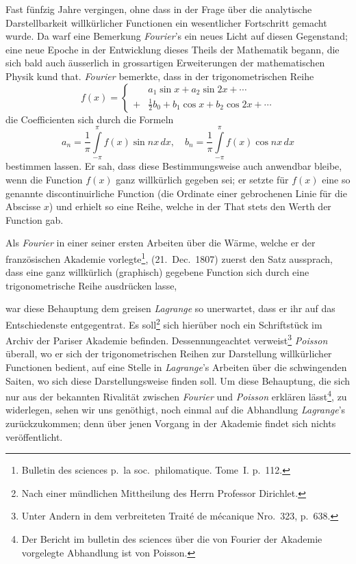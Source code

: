\documentclass[12pt,a4paper]{book}
\theoremstyle{definition}
\theoremstyle{remark}
\begin{document}
Fast fünfzig Jahre vergingen, ohne dass in der Frage über die analytische Darstellbarkeit willkürlicher Functionen ein wesentlicher Fortschritt gemacht wurde. Da warf eine Bemerkung \textit{Fourier}'s ein neues Licht auf diesen Gegenstand; eine neue Epoche in der Entwicklung dieses Theils der Mathematik begann, die sich bald auch äusserlich in grossartigen Erweiterungen der mathematischen Physik kund that. \textit{Fourier} bemerkte, dass in der trigonometrischen Reihe
\[ f(x) = \begin{cases} &a_1\sin x + a_2\sin 2x + \cdots\\ + &\tfrac{1}{2}b_0 + b_1\cos x + b_2\cos 2x + \cdots \end{cases} \]
die Coefficienten sich durch die Formeln
\[ a_n = \frac{1}{\pi}\int\limits_{-\pi}^{\pi} f(x)\sin nx\,dx,\quad b_n = \frac{1}{\pi}\int\limits_{-\pi}^{\pi} f(x)\cos nx\,dx \]
bestimmen lassen. Er sah, dass diese Bestimmungsweise auch anwendbar bleibe, wenn die Function $f(x)$ ganz willkürlich gegeben sei; er setzte für $f(x)$ eine so genannte discontinuirliche Function (die Ordinate einer gebrochenen Linie für die Abscisse $x$) und erhielt so eine Reihe, welche in der That stets den Werth der Function gab.

Als \textit{Fourier} in einer seiner ersten Arbeiten über die Wärme, welche er der französischen Akademie vorlegte\footnote{Bulletin des sciences p.~la soc.~philomatique. Tome~I. p.~112.}, (21.~Dec.\ 1807) zuerst den Satz aussprach, dass eine ganz willkürlich (graphisch) gegebene Function sich durch eine trigonometrische Reihe ausdrücken lasse,

\newpage

war diese Behauptung dem greisen \textit{Lagrange} so unerwartet, dass er ihr auf das Entschiedenste entgegentrat. Es soll\footnote{Nach einer mündlichen Mittheilung des Herrn Professor Dirichlet.} sich hierüber noch ein Schriftstück im Archiv der Pariser Akademie befinden. Dessennungeachtet verweist\footnote{Unter Andern in dem verbreiteten Traité de mécanique Nro.~323, p.~638.} \textit{Poisson} überall, wo er sich der trigonometrischen Reihen zur Darstellung willkürlicher Functionen bedient, auf eine Stelle in \textit{Lagrange}'s Arbeiten über die schwingenden Saiten, wo sich diese Darstellungsweise finden soll. Um diese Behauptung, die sich nur aus der bekannten Rivalität zwischen \textit{Fourier} und \textit{Poisson} erklären lässt\footnote{Der Bericht im bulletin des sciences über die von Fourier der Akademie vorgelegte Abhandlung ist von Poisson.}, zu widerlegen, sehen wir uns genöthigt, noch einmal auf die Abhandlung \textit{Lagrange}'s zurückzukommen; denn über jenen Vorgang in der Akademie findet sich nichts veröffentlicht.
\end{document}
